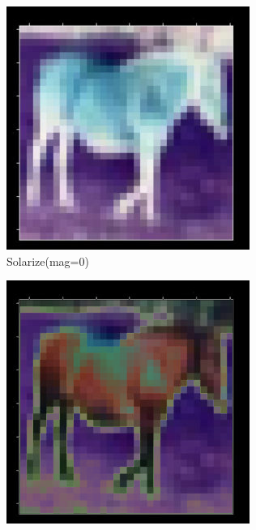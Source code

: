 \documentclass[onecolumn]{ujarticle}   %
\begin{document}
\begin{figure}[h]
      \begin{subfigure}{0.3\columnwidth}
        \centering
        \includegraphics[width=1.0\columnwidth]{transform_test/Solarize_0.png}
        \caption{Solarize(mag=0)}
        \label{fig:Solarize_0}
      \end{subfigure}
      \begin{subfigure}{0.3\columnwidth}
        \centering
        \includegraphics[width=1.0\columnwidth]{transform_test/Solarize_15.png}

\end{subfigure}
\end{figure}
\end{document}
